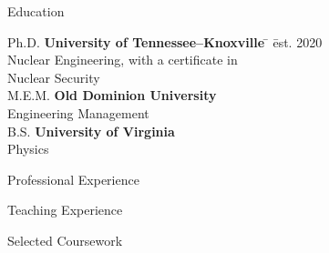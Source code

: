\documentclass{resume2} %
\begin{document}

\begin{rSection}{Education}

\begin{tabbing}
Ph.D. \hspace*{2 em}\= \textbf{University of Tennessee--Knoxville} \hspace*{5em} \= \hspace*{15em} \= est. 2020 \\
      \> Nuclear Engineering, with a certificate in \\ \> Nuclear Security \\
%
M.E.M. \hspace*{2 em}\> \textbf{Old Dominion University} \>  \\
      \> Engineering Management \\
%
B.S. \hspace*{2 em}\> \textbf{University of Virginia} \>  \\
      \> Physics
\end{tabbing}
\end{rSection}

\begin{rSection}{Professional Experience}

\end{rSection}


\clearpage
\begin{rSection}{Teaching Experience}

\end{rSection}

\begin{rSection}{Selected Coursework}

\end{rSection}
\end{document}
